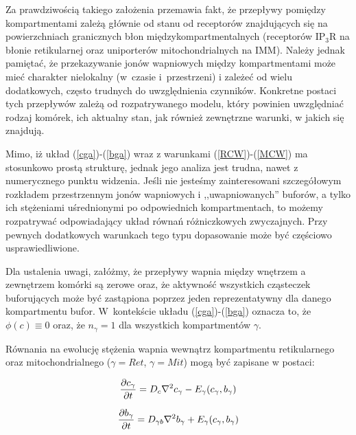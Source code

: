 Za prawdziwością takiego założenia przemawia fakt, że przepływy pomiędzy kompartmentami zależą głównie od stanu od receptorów znajdujących się na powierzchniach granicznych błon międzykompartmentalnych (receptorów IP$_3$R na błonie retikularnej oraz uniporterów mitochondrialnych na IMM). Należy jednak pamiętać, że przekazywanie jonów wapniowych między kompartmentami może mieć charakter nielokalny (w~czasie i~przestrzeni) i zależeć od wielu dodatkowych, często trudnych do uwzględnienia czynników. Konkretne postaci tych przepływów zależą od rozpatrywanego modelu, który powinien uwzględniać rodzaj komórek, ich aktualny stan, jak również zewnętrzne warunki, w jakich się znajdują. 

\medskip 

Mimo, iż układ (\ref{cga})-(\ref{bga}) wraz z warunkami (\ref{RCW})-(\ref{MCW}) ma stosunkowo prostą strukturę, jednak jego analiza jest trudna, nawet z numerycznego punktu widzenia. Jeśli nie jesteśmy zainteresowani szczegółowym rozkładem przestrzennym jonów wapniowych i ,,uwapniowanych'' buforów, a tylko ich stężeniami uśrednionymi po odpowiednich kompartmentach, to możemy rozpatrywać odpowiadający układ równań różniczkowych zwyczajnych. Przy pewnych dodatkowych warunkach tego typu dopasowanie może być częściowo usprawiedliwione.

\bigskip 

Dla ustalenia uwagi, załóżmy, że przepływy wapnia między wnętrzem a zewnętrzem komórki są zerowe oraz, że aktywność wszystkich cząsteczek buforujących może być zastąpiona poprzez jeden reprezentatywny dla danego kompartmentu bufor. W~kontekście układu (\ref{cga})-(\ref{bga}) oznacza to, że $\phi(c) \equiv 0$ oraz, że $n_\gamma = 1$ dla wszystkich kompartmentów $\gamma$. 

\bigskip 

Równania na ewolucję stężenia wapnia wewnątrz kompartmentu retikularnego oraz mitochondrialnego ($\gamma=Ret$, $\gamma = Mit$) mogą być zapisane w postaci:

\begin{equation} \label{ecg} \frac{\partial c_\gamma}{\partial t} = D_c \nabla^2 c_\gamma - E_\gamma (c_\gamma, b_\gamma)
\end{equation} 

\begin{equation} \label{ecbg} \frac{\partial b_\gamma}{\partial t} = D_{\gamma b} \nabla^2 b_\gamma + E_\gamma (c_\gamma, b_\gamma)
\end{equation} 

\medskip 

